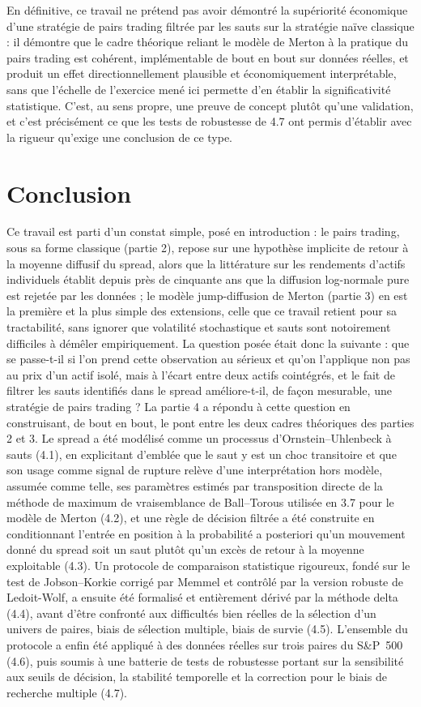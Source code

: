 \documentclass{article}
\begin{document}
En définitive, ce travail ne prétend pas avoir démontré la supériorité économique d'une stratégie de pairs trading filtrée par les sauts sur la stratégie naïve classique : il démontre que le cadre théorique reliant le modèle de Merton à la pratique du pairs trading est cohérent, implémentable de bout en bout sur données réelles, et produit un effet directionnellement plausible et économiquement interprétable, sans que l'échelle de l'exercice mené ici permette d'en établir la significativité statistique. C'est, au sens propre, une preuve de concept plutôt qu'une validation, et c'est précisément ce que les tests de robustesse de 4.7 ont permis d'établir avec la rigueur qu'exige une conclusion de ce type.
\section{Conclusion}
Ce travail est parti d'un constat simple, posé en introduction : le pairs trading, sous sa forme classique (partie 2), repose sur une hypothèse implicite de retour à la moyenne diffusif du spread, alors que la littérature sur les rendements d'actifs individuels établit depuis près de cinquante ans que la diffusion log-normale pure est rejetée par les données ; le modèle jump-diffusion de Merton (partie 3) en est la première et la plus simple des extensions, celle que ce travail retient pour sa tractabilité, sans ignorer que volatilité stochastique et sauts sont notoirement difficiles à démêler empiriquement. La question posée était donc la suivante : que se passe-t-il si l'on prend cette observation au sérieux et qu'on l'applique non pas au prix d'un actif isolé, mais à l'écart entre deux actifs cointégrés, et le fait de filtrer les sauts identifiés dans le spread améliore-t-il, de façon mesurable, une stratégie de pairs trading ?
La partie 4 a répondu à cette question en construisant, de bout en bout, le pont entre les deux cadres théoriques des parties 2 et 3. Le spread a été modélisé comme un processus d'Ornstein--Uhlenbeck à sauts (4.1), en explicitant d'emblée que le saut y est un choc transitoire et que son usage comme signal de rupture relève d'une interprétation hors modèle, assumée comme telle, ses paramètres estimés par transposition directe de la méthode de maximum de vraisemblance de Ball--Torous utilisée en 3.7 pour le modèle de Merton (4.2), et une règle de décision filtrée a été construite en conditionnant l'entrée en position à la probabilité a posteriori qu'un mouvement donné du spread soit un saut plutôt qu'un excès de retour à la moyenne exploitable (4.3). Un protocole de comparaison statistique rigoureux, fondé sur le test de Jobson--Korkie corrigé par Memmel et contrôlé par la version robuste de Ledoit-Wolf, a ensuite été formalisé et entièrement dérivé par la méthode delta (4.4), avant d'être confronté aux difficultés bien réelles de la sélection d'un univers de paires, biais de sélection multiple, biais de survie (4.5). L'ensemble du protocole a enfin été appliqué à des données réelles sur trois paires du S\&P~500 (4.6), puis soumis à une batterie de tests de robustesse portant sur la sensibilité aux seuils de décision, la stabilité temporelle et la correction pour le biais de recherche multiple (4.7).
\end{document}
